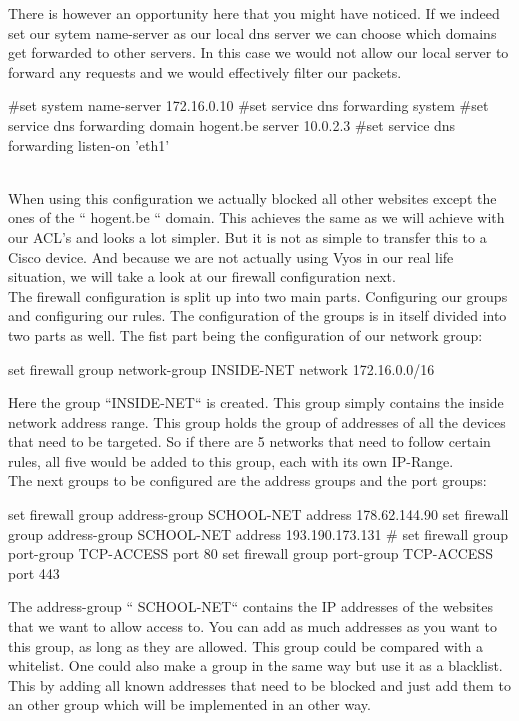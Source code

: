 There is however an opportunity here that you might have noticed. If we indeed set our sytem name-server as our local dns server we can choose which domains get forwarded to other servers. In this case we would not allow our local server to forward any requests and we would effectively filter our packets.
\begin{cisco}[title=Filtering using DNS forwarding]
#set system name-server 172.16.0.10
#set service dns forwarding system
#set service dns forwarding domain hogent.be server 10.0.2.3
#set service dns forwarding listen-on 'eth1'
\end{cisco}\\
When using this configuration we actually blocked all other websites except the ones of the `` hogent.be `` domain. This achieves the same as we will achieve with our ACL's and looks a lot simpler. But it is not as simple to transfer this to a Cisco device. And because we are not actually using Vyos in our real life situation, we will take a look at our firewall configuration next.\\
The firewall configuration is split up into two main parts. Configuring our groups and configuring our rules. The configuration of the groups is in itself divided into two parts as well. The fist part being the configuration of our network group:\\
\begin{cisco}[title=network group configuration]
set firewall group network-group INSIDE-NET network 172.16.0.0/16
\end{cisco}
Here the group ``INSIDE-NET`` is created. This group simply contains the inside network address range. This group holds the group of addresses of all the devices that need to be targeted. So if there are 5 networks that need to follow certain rules, all five would be added to this group, each with its own IP-Range.\\
The next groups to be configured are the address groups and the port groups:\\
\begin{cisco}[title= address and port groups configuration]
set firewall group address-group SCHOOL-NET address 178.62.144.90
set firewall group address-group SCHOOL-NET address 193.190.173.131
# 
set firewall group port-group TCP-ACCESS port 80
set firewall group port-group TCP-ACCESS port 443
\end{cisco}
The address-group `` SCHOOL-NET`` contains the IP addresses of the websites that we want to allow access to. You can add as much addresses as you want to this group, as long as they are allowed. This group could be compared with a whitelist. One could also make a group in the same way but use it as a blacklist. This by adding all known addresses that need to be blocked and just add them to an other group which will be implemented in an other way.\\

